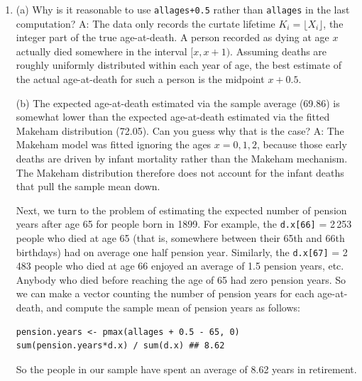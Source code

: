 \documentclass{article}
\begin{document}
\begin{enumerate}
\begin{verbatim}
sum((allages+0.5)*d.x) / sum(d.x) ## 69.86
\end{verbatim}
\newpage
\item[$\boldsymbol{Q_4}$] (a) Why is it reasonable to use \texttt{allages+0.5} rather than \texttt{allages} in the last computation?
\newline \newline A:
The data only records the curtate lifetime $K_i = \lfloor X_i \rfloor$, the integer part of the true age-at-death. A person recorded as dying at age $x$ actually died somewhere in the interval $[x,x+1)$. 
Assuming deaths are roughly uniformly distributed within each year of age, the best estimate of the actual age-at-death for such a person is the midpoint $x+0.5$. 

(b) The expected age-at-death estimated via the sample average (69.86) is somewhat lower than the expected age-at-death estimated via the fitted Makeham distribution (72.05). Can you guess why that is the case?
\newline \newline A: 
The Makeham model was fitted ignoring the ages $x=0,1,2$, because those early deaths are driven by infant mortality rather than the Makeham mechanism. 
The Makeham distribution therefore does not account for the infant deaths that pull the sample mean down.

\newpage
Next, we turn to the problem of estimating the expected number of pension years after age 65 for people born in 1899. For example, the \texttt{d.x[66]} = 2\,253 people who died at age 65 (that is, somewhere between their 65th and 66th birthdays) had on average one half pension year. Similarly, the \texttt{d.x[67]} = 2\,483 people who died at age 66 enjoyed an average of 1.5 pension years, etc. Anybody who died before reaching the age of 65 had zero pension years. So we can make a vector counting the number of pension years for each age-at-death, and compute the sample mean of pension years as follows:

\begin{verbatim}
pension.years <- pmax(allages + 0.5 - 65, 0)
sum(pension.years*d.x) / sum(d.x) ## 8.62
\end{verbatim}

So the people in our sample have spent an average of 8.62 years in retirement.


\end{enumerate}
\end{document}
